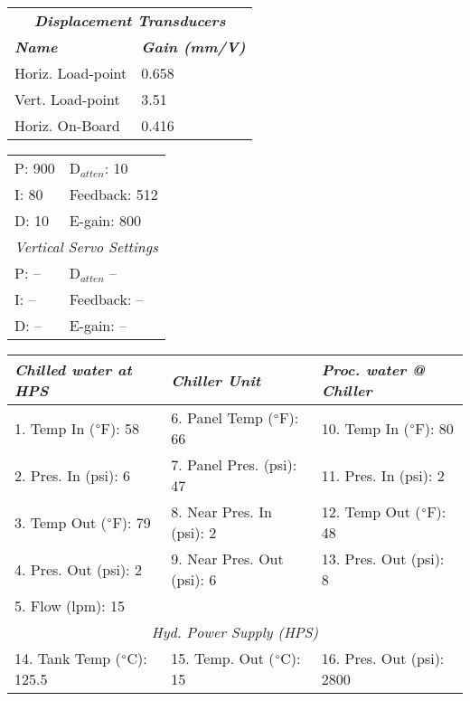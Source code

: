 \documentclass[letterpaper, 10pt]{article}
\begin{document}
\begin{table}[ht!]
    \small
    \renewcommand{\arraystretch}{1.2}
    \begin{tabular}{ l l } 
        \multicolumn{2}{c}{\textbf{\textit{Displacement Transducers}}} \\
        \textbf{\textit{Name}} & \textbf{\textit{Gain (mm/V)}} \\ \hline Horiz. Load-point &  0.658 \\ \hline Vert. Load-point &  3.51 \\ \hline Horiz. On-Board &  0.416 \\ \hline  \end{tabular}
    \end{table} \vspace{-0.5cm} 

\begin{table}[!ht]
        \footnotesize
        \renewcommand{\arraystretch}{1.1}
        \begin{tabular}{ p{1cm}|p{2cm} } \rowcolor[HTML]{EFEFEF}
            \multicolumn{2}{c}{\textit{Horizontal Servo Settings} \cellcolor[HTML]{EFEFEF}} \\ \hline P: 900 & D$_{atten}$: 10 \\ \hline
        I: 80 & Feedback: 512 \\ \hline 
        D: 10 & E-gain: 800 \\ \hline 
        \multicolumn{2}{c}{\textit{Vertical Servo Settings} \cellcolor[HTML]{EFEFEF}} \\ \hline 
        P: -- & D$_{atten}$  -- \\ \hline 
        I: -- & Feedback: -- \\ \hline
        D: -- & E-gain: -- \\ \hline 
    \end{tabular} \hfill 
        \renewcommand{\arraystretch}{1.1}
        \begin{tabular}{ l|l|l } \rowcolor[HTML]{EFEFEF}
        \textit{Chilled water at HPS} & \textit{Chiller Unit} & \textit{Proc. water @ Chiller} \\ \hline 1. Temp In ($\degree$F): 58 & 6. Panel Temp ($\degree$F): 66 & 10. Temp In ($\degree$F): 80 \\ \hline 
    2. Pres. In (psi): 6 & 7. Panel Pres. (psi): 47 & 11. Pres. In (psi): 2 \\ \hline 
    3. Temp Out ($\degree$F): 79 & 8. Near Pres. In (psi): 2& 12. Temp Out ($\degree$F): 48 \\ \hline 
    4. Pres. Out (psi): 2& 9. Near Pres. Out (psi): 6& 13. Pres. Out (psi): 8 \\ \hline 
    5. Flow (lpm): 15 \\ \hline 
    \multicolumn{3}{c}{\textit{Hyd. Power Supply (HPS)} \cellcolor[HTML]{EFEFEF}} \\ \hline 
    14. Tank Temp ($\degree$C):   125.5 & 15. Temp. Out ($\degree$C): 15 & 16. Pres. Out (psi): 2800 \\ \hline 
    \end{tabular} 
    \end{table} \vspace{-0.5cm} 
\end{document}
